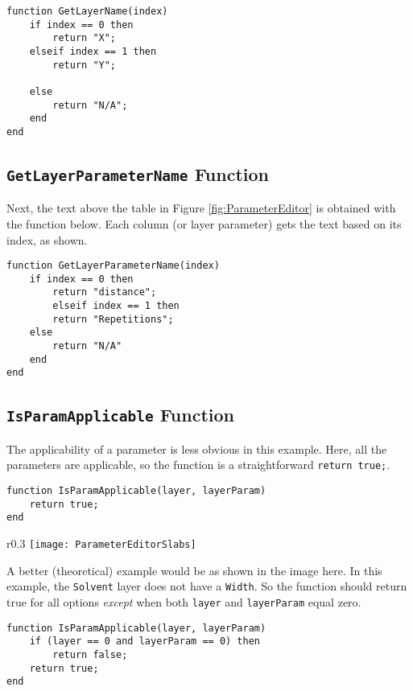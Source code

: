 \documentclass[../D+Manual.tex]{subfiles}
\begin{document}
\begin{lstlisting}[basicstyle = \small]
function GetLayerName(index)
	if index == 0 then
		return "X";
	elseif index == 1 then
		return "Y";
	
	else	
		return "N/A";
	end
end

\end{lstlisting}

\subsection{\lstinline|GetLayerParameterName| Function}
Next, the text above the table in Figure \ref{fig:ParameterEditor} is obtained with the function below. Each column (or layer parameter) gets the text based on its index, as shown.
\begin{lstlisting}[basicstyle = \small]
function GetLayerParameterName(index)
	if index == 0 then
		return "distance";
		elseif index == 1 then
		return "Repetitions";
	else
		return "N/A"
	end
end
\end{lstlisting}

\subsection{\lstinline|IsParamApplicable| Function}
The applicability of a parameter is less obvious in this example. Here, all the parameters are applicable, so the function is a straightforward \lstinline|return true;|.

\begin{lstlisting}[basicstyle = \small]
function IsParamApplicable(layer, layerParam)
	return true;
end
\end{lstlisting}

\begin{wrapfigure}{r}{0.3\textwidth}
	\vspace{-10pt}
	\centering
    \texttt{[image: ParameterEditorSlabs]}
\end{wrapfigure}

A better (theoretical) example would be as shown in the image here. In this example, the \texttt{Solvent} layer does not have a \texttt{Width}. So the function should return true for all options \textit{except} when both \lstinline|layer| and \lstinline|layerParam| equal zero.

\begin{lstlisting}[basicstyle = \small]
function IsParamApplicable(layer, layerParam)
	if (layer == 0 and layerParam == 0) then
		return false;
	return true;
end
\end{lstlisting}
\end{document}
